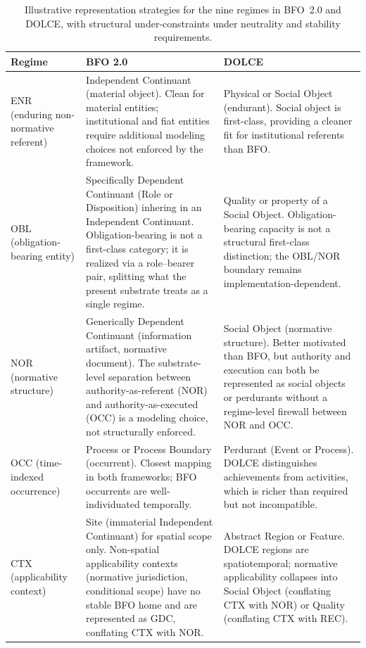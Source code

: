 \begin{table}[!htbp]
\centering
\caption{Illustrative representation strategies for the nine regimes
in BFO~2.0 and DOLCE, with structural under-constraints
under neutrality and stability requirements.}
\label{tab:regime-mapping}
\small
\renewcommand{\arraystretch}{1.15}
\begin{tabular}{@{} p{1.5cm} p{5.2cm} p{4.7cm}@{}}
\toprule
\textbf{Regime} & \textbf{BFO 2.0} & \textbf{DOLCE} \\
\midrule

ENR (enduring non-normative referent) & Independent Continuant (material object).
Clean for material entities; institutional and fiat entities
require additional modeling choices not enforced by the framework. &
Physical or Social Object (endurant).
Social object is first-class, providing a cleaner fit for
institutional referents than BFO. \\

OBL (obligation-bearing entity) &
Specifically Dependent Continuant (Role or Disposition)
inhering in an Independent Continuant.
Obligation-bearing is not a first-class category;
it is realized via a role--bearer pair,
splitting what the present substrate treats as a single regime. &
Quality or property of a Social Object.
Obligation-bearing capacity is not a structural first-class
distinction; the OBL/NOR boundary remains implementation-dependent. \\

NOR (normative structure) &
Generically Dependent Continuant (information artifact,
normative document).
The substrate-level separation between authority-as-referent (NOR)
and authority-as-executed (OCC) is a modeling choice,
not structurally enforced. &
Social Object (normative structure).
Better motivated than BFO, but authority and execution
can both be represented as social objects or perdurants
without a regime-level firewall between NOR and OCC. \\

OCC (time-indexed occurrence) &
Process or Process Boundary (occurrent).
Closest mapping in both frameworks;
BFO occurrents are well-individuated temporally. &
Perdurant (Event or Process).
DOLCE distinguishes achievements from activities,
which is richer than required but not incompatible. \\

CTX (applicability context) &
Site (immaterial Independent Continuant) for spatial scope only.
Non-spatial applicability contexts (normative jurisdiction,
conditional scope) have no stable BFO home and are represented
as GDC, conflating CTX with NOR. &
Abstract Region or Feature.
DOLCE regions are spatiotemporal;
normative applicability collapses into Social Object
(conflating CTX with NOR) or Quality (conflating CTX with REC). \\


\end{tabular}
\end{table}
